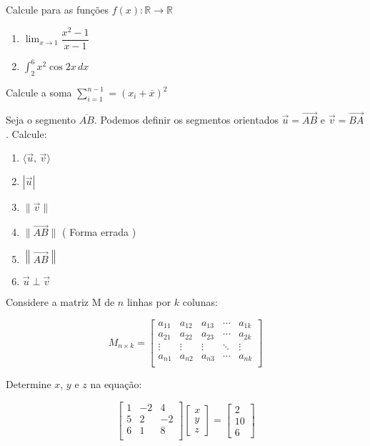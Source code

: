 \documentclass[a4paper,12pt]{article}
\newcommand{\limite}{\displaystyle\lim}
\newcommand{\integral}{\displaystyle\int}
\newcommand{\somatorio}{\displaystyle\sum}
\begin{document}
Calcule para as funções $f(x) : \mathbb{R} \to \mathbb{R}$

\begin{enumerate}
  \item $\limite_{x \to 1} \dfrac{x^2-1}{x-1}$
  \item $\integral_2^6 x^2\cos 2x\, dx$
\end{enumerate}

Calcule a soma $\somatorio_{i=1}^{n-1}=(x_i + \overline{x})^2$


Seja o segmento $\overline{AB}$. Podemos definir os segmentos orientados $\vec{u} = \overrightarrow{AB}$ e $\vec{v} = \overrightarrow{BA}$. Calcule:
\begin{enumerate}
  \item $\langle \vec{u},\, \vec{v} \rangle$
  \item $|\vec{u}|$
  \item $\|\vec{v}\|$
  \item $\|\overrightarrow{AB}\|$   ( Forma errada )
  \item $\left\|\overrightarrow{AB}\right\|$
  \item $\vec{u} \perp \vec{v}$
\end{enumerate}


Considere a matriz M de $n$ linhas por $k$ colunas:

$$
M_{n \times k}= 
\begin{bmatrix}
a_{11} & a_{12} & a_{13} & \cdots & a_{1k} \\
a_{21} & a_{22} & a_{23} & \cdots & a_{2k} \\
\vdots & \vdots & \vdots & \ddots & \vdots \\
a_{n1} & a_{n2} & a_{n3} & \cdots & a_{nk} \\
\end{bmatrix}
$$
  
  
Determine $x$, $y$ e $z$ na equação:

$$
\begin{bmatrix}
  1 & -2 &  4 \\
  5 &  2 & -2 \\
  6 &  1 &  8 \\  
\end{bmatrix}
\begin{bmatrix}
x \\ y \\ z
\end{bmatrix}
=
\begin{bmatrix}
 2 \\ 10 \\ 6
\end{bmatrix}
$$
 
\end{document}
